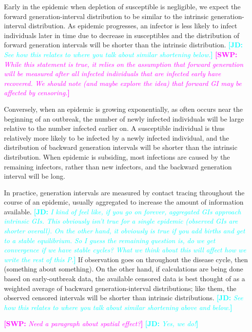 \documentclass{article}
\newcommand{\comment}[3]{\textcolor{#1}{\textbf{[#2: }\textsl{#3}\textbf{]}}}
\newcommand{\jd}[1]{\comment{cyan}{JD}{#1}}
\newcommand{\swp}[1]{\comment{magenta}{SWP}{#1}}
\begin{document}
Early in the epidemic when depletion of susceptible is negligible, we expect the forward generation-interval distribution to be similar to the intrinsic generation-interval distribution.
As epidemic progresses, an infector is less likely to infect individuals later in time due to decrease in susceptibles and the distribution of forward generation intervals will be shorter than the intrinsic distribution.
\jd{See how this relates to where you talk about similar shortening below.}
\swp{While this statement is true, it relies on the assumption that forward generation will be measured after all infected individuals that are infected early have recovered. We should note (and maybe explore the idea) that forward GI may be affected by censoring.}

Conversely, when an epidemic is growing exponentially, as often occurs near the beginning of an outbreak, the number of newly infected individuals will be large relative to the number infected earlier on. 
A susceptible individual is thus relatively more likely to be infected by a newly infected individual, and the distribution of backward generation intervals will be shorter than the intrinsic distribution.
When epidemic is subsiding, most infections are caused by the remaining infectors, rather than new infectors, and the backward generation interval will be long.

In practice, generation intervals are measured by contact tracing throughout the course of an epidemic, usually aggregated to increase the amount of information available. 
\jd{I kind of feel like, if you go on forever, aggregated GIs approach intrinsic GIs. This obviously isn't true for a single epidemic (observed GIs are shorter overall). On the other hand, it obviously \emph{is} true if you add births and get to a stable equilibrium. So I guess the remaining question is, do we get convergence if we have stable cycles? What we think about this will affect how we write the rest of this P.} 
If observation goes on throughout the disease cycle, then (something about something).
On the other hand, if calculations are being done based on early-outbreak data, the available censored data is best thought of as a weighted average of backward generation-interval distributions; like them, the observed censored intervals will be shorter than intrinsic distributions.
\jd{See how this relates to where you talk about similar shortening above and below.}

\swp{Need a paragraph about spatial effect?}
\jd{Yes, we do!}
\end{document}
